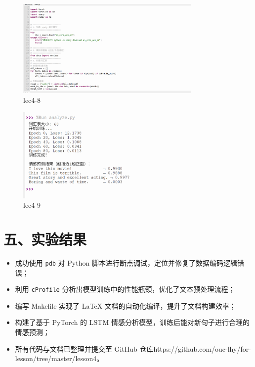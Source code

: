 \documentclass[a4paper, 12pt]{article}
\begin{document}
\begin{figure}[htbp]
    \centering
    \includegraphics[width=0.8\textwidth]{lec4 (8).png}
    \caption{lec4-8}
\end{figure}

\begin{figure}[htbp]
    \centering
    \includegraphics[width=0.8\textwidth]{lec4 (9).png}
    \caption{lec4-9}
\end{figure}

\newpage

\section*{五、实验结果}
\begin{itemize}
    \item 成功使用 \texttt{pdb} 对 Python 脚本进行断点调试，定位并修复了数据编码逻辑错误；
    \item 利用 \texttt{cProfile} 分析出模型训练中的性能瓶颈，优化了文本预处理流程；
    \item 编写 Makefile 实现了 LaTeX 文档的自动化编译，提升了文档构建效率；
    \item 构建了基于 PyTorch 的 LSTM 情感分析模型，训练后能对新句子进行合理的情感预测；
    \item 所有代码与文档已整理并提交至 GitHub 仓库https://github.com/ouc-lhy/for-lesson/tree/master/lesson4。
\end{itemize}
\end{document}
